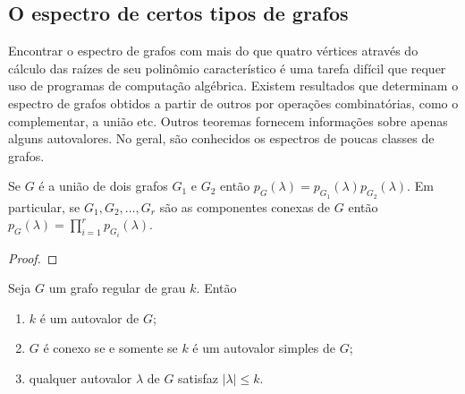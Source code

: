 \documentclass{article}
\begin{document}
\subsection{O espectro de certos tipos de grafos}

Encontrar o espectro de grafos com mais do que quatro vértices através do cálculo das raízes de seu polinômio característico é uma tarefa difícil que requer uso de programas de computação algébrica. Existem resultados que determinam o espectro de grafos obtidos a partir de outros por operações combinatórias, como o complementar, a união etc. Outros teoremas fornecem informações sobre apenas alguns autovalores. No geral, são conhecidos os espectros de poucas classes de grafos.

\begin{prop} \label{prop:polinomio_uniao}
    Se \(G\) é a união de dois grafos \(G_1\) e \(G_2\) então \(p_G(\lambda) = p_{G_1}(\lambda) p_{G_2}(\lambda)\). Em particular, se \(G_1, G_2, \ldots, G_r\) são as componentes conexas de \(G\) então \(p_G(\lambda) = \prod_{i=1}^r p_{G_i}(\lambda)\).
\end{prop}

\begin{proof}
    
\end{proof}

\begin{prop}
    Seja \(G\) um grafo regular de grau \(k\). Então
    \begin{enumerate}
        \item [a.] \(k\) é um autovalor de \(G\);
        \item [b.] \(G\) é conexo se e somente se \(k\) é um autovalor simples de \(G\);
        \item [c.] qualquer autovalor \(\lambda\) de \(G\) satisfaz \(|\lambda| \leq k\).
    \end{enumerate}
\end{prop}
\end{document}
